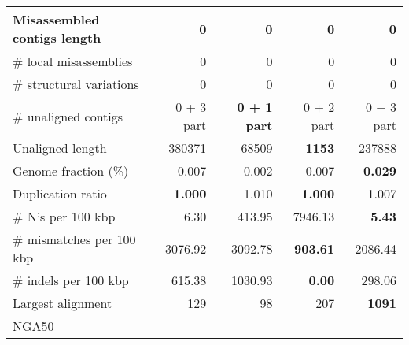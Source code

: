 \documentclass[12pt,a4paper]{article}
\begin{document}
\begin{table}[ht]
\begin{center}
\begin{tabular}{|l*{4}{|r}|}
Misassembled contigs length & 0 & 0 & 0 & 0 \\ \hline
\# local misassemblies & 0 & 0 & 0 & 0 \\ \hline
\# structural variations & 0 & 0 & 0 & 0 \\ \hline
\# unaligned contigs & 0 + 3 part & {\bf 0 + 1 part} & 0 + 2 part & 0 + 3 part \\ \hline
Unaligned length & 380371 & 68509 & {\bf 1153} & 237888 \\ \hline
Genome fraction (\%) & 0.007 & 0.002 & 0.007 & {\bf 0.029} \\ \hline
Duplication ratio & {\bf 1.000} & 1.010 & {\bf 1.000} & 1.007 \\ \hline
\# N's per 100 kbp & 6.30 & 413.95 & 7946.13 & {\bf 5.43} \\ \hline
\# mismatches per 100 kbp & 3076.92 & 3092.78 & {\bf 903.61} & 2086.44 \\ \hline
\# indels per 100 kbp & 615.38 & 1030.93 & {\bf 0.00} & 298.06 \\ \hline
Largest alignment & 129 & 98 & 207 & {\bf 1091} \\ \hline
NGA50 & - & - & - & - \\ \hline
\end{tabular}
\end{center}
\end{table}
\end{document}
